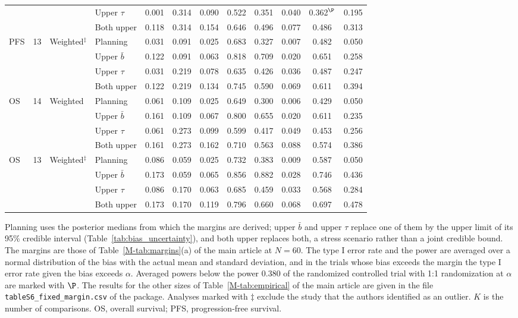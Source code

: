 \begin{table}[!htb]
\begin{tabular}{lcllcccccccc}
 &  &  & Upper $\tau$ & 0.001 & 0.314 & 0.090 & 0.522 & 0.351 & 0.040 & 0.362$^{\P}$ & 0.195 \\
 &  &  & Both upper & 0.118 & 0.314 & 0.154 & 0.646 & 0.496 & 0.077 & 0.486 & 0.313 \\
PFS & 13 & Weighted$^{\ddagger}$ & Planning & 0.031 & 0.091 & 0.025 & 0.683 & 0.327 & 0.007 & 0.482 & 0.050 \\
 &  &  & Upper $\bar{b}$ & 0.122 & 0.091 & 0.063 & 0.818 & 0.709 & 0.020 & 0.651 & 0.258 \\
 &  &  & Upper $\tau$ & 0.031 & 0.219 & 0.078 & 0.635 & 0.426 & 0.036 & 0.487 & 0.247 \\
 &  &  & Both upper & 0.122 & 0.219 & 0.134 & 0.745 & 0.590 & 0.069 & 0.611 & 0.394 \\
OS & 14 & Weighted & Planning & 0.061 & 0.109 & 0.025 & 0.649 & 0.300 & 0.006 & 0.429 & 0.050 \\
 &  &  & Upper $\bar{b}$ & 0.161 & 0.109 & 0.067 & 0.800 & 0.655 & 0.020 & 0.611 & 0.235 \\
 &  &  & Upper $\tau$ & 0.061 & 0.273 & 0.099 & 0.599 & 0.417 & 0.049 & 0.453 & 0.256 \\
 &  &  & Both upper & 0.161 & 0.273 & 0.162 & 0.710 & 0.563 & 0.088 & 0.574 & 0.386 \\
OS & 13 & Weighted$^{\ddagger}$ & Planning & 0.086 & 0.059 & 0.025 & 0.732 & 0.383 & 0.009 & 0.587 & 0.050 \\
 &  &  & Upper $\bar{b}$ & 0.173 & 0.059 & 0.065 & 0.856 & 0.882 & 0.028 & 0.746 & 0.436 \\
 &  &  & Upper $\tau$ & 0.086 & 0.170 & 0.063 & 0.685 & 0.459 & 0.033 & 0.568 & 0.284 \\
 &  &  & Both upper & 0.173 & 0.170 & 0.119 & 0.796 & 0.660 & 0.068 & 0.697 & 0.478 \\
\bottomrule
\end{tabular}
\par\smallskip
\begin{minipage}{0.95\linewidth}
\footnotesize
Planning uses the posterior medians from which the margins are derived; upper $\bar{b}$ and upper $\tau$ replace one of them by the upper limit of its 95\% credible interval (Table~\ref{tab:bias_uncertainty}), and both upper replaces both, a stress scenario rather than a joint credible bound. The margins are those of Table~\ref{M-tab:margins}(a) of the main article at $N = 60$. The type I error rate and the power are averaged over a normal distribution of the bias with the actual mean and standard deviation, and in the trials whose bias exceeds the margin the type I error rate given the bias exceeds $\alpha$. Averaged powers below the power 0.380 of the randomized controlled trial with 1:1 randomization at $\alpha$ are marked with $\P$. The results for the other sizes of Table~\ref{M-tab:empirical} of the main article are given in the file \texttt{tableS6\_fixed\_margin.csv} of the package. Analyses marked with $\ddagger$ exclude the study that the authors identified as an outlier. $K$ is the number of comparisons. OS, overall survival; PFS, progression-free survival.
\end{minipage}
\end{table}
